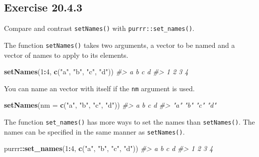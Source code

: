 \documentclass[]{book}
\newenvironment{Shaded}{\begin{snugshade}}{\end{snugshade}}
\newcommand{\CommentTok}[1]{\textcolor[rgb]{0.56,0.35,0.01}{\textit{#1}}}
\newcommand{\DataTypeTok}[1]{\textcolor[rgb]{0.13,0.29,0.53}{#1}}
\newcommand{\DecValTok}[1]{\textcolor[rgb]{0.00,0.00,0.81}{#1}}
\newcommand{\KeywordTok}[1]{\textcolor[rgb]{0.13,0.29,0.53}{\textbf{#1}}}
\newcommand{\NormalTok}[1]{#1}
\newcommand{\OperatorTok}[1]{\textcolor[rgb]{0.81,0.36,0.00}{\textbf{#1}}}
\newcommand{\StringTok}[1]{\textcolor[rgb]{0.31,0.60,0.02}{#1}}
\theoremstyle{plain}
\theoremstyle{remark}
\theoremstyle{definition}
\theoremstyle{definition}
\theoremstyle{definition}
\theoremstyle{remark}
\begin{document}
\hypertarget{exercise-20.4.3}{%
\subsection*{\texorpdfstring{Exercise
{20.4.3}}{Exercise 20.4.3}}\label{exercise-20.4.3}}

Compare and contrast \texttt{setNames()} with
\texttt{purrr::set\_names()}.

The function \texttt{setNames()} takes two arguments, a vector to be
named and a vector of names to apply to its elements.

\begin{Shaded}
\begin{Highlighting}[]
\KeywordTok{setNames}\NormalTok{(}\DecValTok{1}\OperatorTok{:}\DecValTok{4}\NormalTok{, }\KeywordTok{c}\NormalTok{(}\StringTok{"a"}\NormalTok{, }\StringTok{"b"}\NormalTok{, }\StringTok{"c"}\NormalTok{, }\StringTok{"d"}\NormalTok{))}
\CommentTok{#> a b c d }
\CommentTok{#> 1 2 3 4}
\end{Highlighting}
\end{Shaded}

You can name an vector with itself if the \texttt{nm} argument is used.

\begin{Shaded}
\begin{Highlighting}[]
\KeywordTok{setNames}\NormalTok{(}\DataTypeTok{nm =} \KeywordTok{c}\NormalTok{(}\StringTok{"a"}\NormalTok{, }\StringTok{"b"}\NormalTok{, }\StringTok{"c"}\NormalTok{, }\StringTok{"d"}\NormalTok{))}
\CommentTok{#>   a   b   c   d }
\CommentTok{#> "a" "b" "c" "d"}
\end{Highlighting}
\end{Shaded}

The function \texttt{set\_names()} has more ways to set the names than
\texttt{setNames()}. The names can be specified in the same manner as
\texttt{setNames()}.

\begin{Shaded}
\begin{Highlighting}[]
\NormalTok{purrr}\OperatorTok{::}\KeywordTok{set_names}\NormalTok{(}\DecValTok{1}\OperatorTok{:}\DecValTok{4}\NormalTok{, }\KeywordTok{c}\NormalTok{(}\StringTok{"a"}\NormalTok{, }\StringTok{"b"}\NormalTok{, }\StringTok{"c"}\NormalTok{, }\StringTok{"d"}\NormalTok{))}
\CommentTok{#> a b c d }
\CommentTok{#> 1 2 3 4}
\end{Highlighting}
\end{Shaded}
\end{document}
